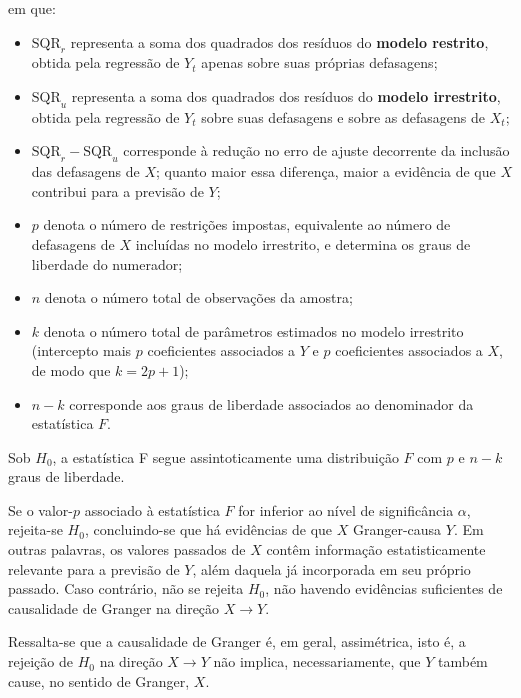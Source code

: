 \noindent em que:
\begin{itemize}
    \item $\mathrm{SQR}_r$ representa a soma dos quadrados dos resíduos do \textbf{modelo restrito}, obtida pela regressão de $Y_t$ apenas sobre suas próprias defasagens;
    
    \item $\mathrm{SQR}_u$ representa a soma dos quadrados dos resíduos do \textbf{modelo irrestrito}, obtida pela regressão de $Y_t$ sobre suas defasagens e sobre as defasagens de $X_t$;
    
    \item $\mathrm{SQR}_r - \mathrm{SQR}_u$ corresponde à redução no erro de ajuste decorrente da inclusão das defasagens de $X$; quanto maior essa diferença, maior a evidência de que $X$ contribui para a previsão de $Y$;
    
    \item $p$ denota o número de restrições impostas, equivalente ao número de defasagens de $X$ incluídas no modelo irrestrito, e determina os graus de liberdade do numerador;
    
    \item $n$ denota o número total de observações da amostra;
    
    \item $k$ denota o número total de parâmetros estimados no modelo irrestrito (intercepto mais $p$ coeficientes associados a $Y$ e $p$ coeficientes associados a $X$, de modo que $k = 2p + 1$);
    
    \item $n - k$ corresponde aos graus de liberdade associados ao denominador da estatística $F$.
\end{itemize}

\noindent Sob $H_0$, a estatística F segue assintoticamente uma distribuição $F$ com $p$ e $n - k$ graus de liberdade.

Se o valor-$p$ associado à estatística $F$ for inferior ao nível de significância $\alpha$, rejeita-se $H_0$, concluindo-se que há evidências de que $X$ Granger-causa $Y$. Em outras palavras, os valores passados de $X$ contêm informação estatisticamente relevante para a previsão de $Y$, além daquela já incorporada em seu próprio passado. Caso contrário, não se rejeita $H_0$, não havendo evidências suficientes de causalidade de Granger na direção $X \to Y$.


Ressalta-se que a causalidade de Granger é, em geral, assimétrica, isto é, a rejeição de $H_0$ na direção $X \to Y$ não implica, necessariamente, que $Y$ também cause, no sentido de Granger, $X$.

